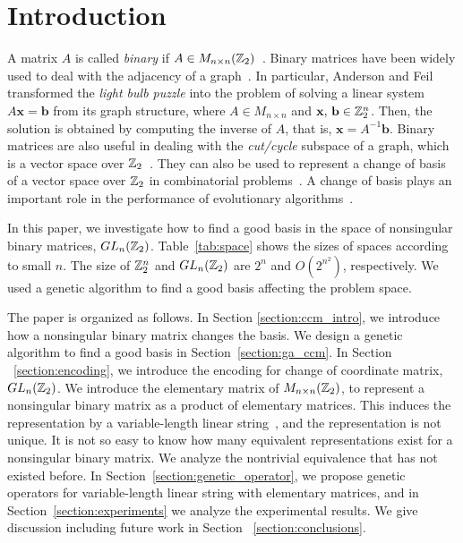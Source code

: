 \section{Introduction}
A matrix $ A $ is called \textit{binary} if $ A \in M_{n \times n}(\mathbb{Z}_2) $~\cite{kim2008two}.
Binary matrices have been widely used to deal with the adjacency of a graph~\cite{anderson1998turning, biggs1993algebraic,brualdi1991combinatorial, kim2005new}.
In particular,
Anderson and Feil~\cite{anderson1998turning} transformed the \textit{light bulb puzzle} into the problem of solving a linear system $ A\mathbf{x} = \mathbf{b} $ from its graph structure,
where $ A \in M_{n \times n } $ and $ \mathbf{x},\, \mathbf{b} \in \mathbb{Z}_2^n $.
Then, the solution is obtained by computing the inverse of $ A $, that is, $ \mathbf{x} = A^{-1} \mathbf{b} $.
Binary matrices are also useful in dealing with the \textit{cut/cycle} subspace of a graph, which is a vector space over $ \mathbb{Z}_2 $~\cite{biggs1993algebraic,yoon2011note}.
They can also be used to represent a change of basis of a vector space over $ \mathbb{Z}_2 $ in combinatorial problems~\cite{kim2008linear,kim2008effect}.
A change of basis plays an important role in the performance of evolutionary algorithms~\cite{kim2008effect,hwang2006multi,kim2003problem,seo2012spanning,wyatt2003finding}.

In this paper,
we investigate how to find a good basis in the space of nonsingular binary matrices, $ GL_n(\mathbb{Z}_2)$.
Table~\ref{tab:space} shows the sizes of spaces according to small $ n $.
The size of $ \mathbb{Z}_2^n $ and $ GL_n(\mathbb{Z}_2) $ are $ 2^n $ and $ O(2^{n^2}) $, respectively.
We used a genetic algorithm to find a good basis affecting the problem space.

The paper is organized as follows.
In Section \ref{section:ccm_intro}, we introduce how a nonsingular binary matrix changes the basis.
We design a genetic algorithm to find a good basis in Section~\ref{section:ga_ccm}.
In Section ~\ref{section:encoding}, we introduce the encoding for change of coordinate matrix, $ GL_n(\mathbb{Z}_2) $.
We introduce the elementary matrix of $ M_{n \times n}(\mathbb{Z}_2) $,
to represent a nonsingular binary matrix as a product of elementary matrices.
This induces the representation by a variable-length linear string~\cite{yoon2014mathematical}, and the representation is not unique.
It is not so easy to know how many equivalent representations exist for a nonsingular binary matrix.
We analyze the nontrivial equivalence that has not existed before.
In Section~\ref{section:genetic_operator}, we propose genetic operators for variable-length linear string with elementary matrices, and in Section~\ref{section:experiments} we analyze the experimental results.
We give discussion including future work in Section ~\ref{section:conclusions}.








